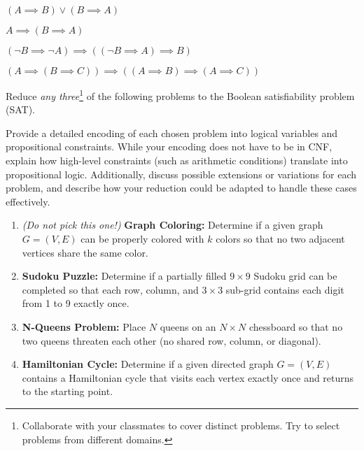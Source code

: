 \documentclass[a4paper,12pt]{article}
\begin{document}
\begin{tasks}
    \begin{multicols}{2}
    \begin{subtasks}
        \item $(A \implies B) \lor (B \implies A)$
        \item $A \implies (B \implies A)$
        \item $(\neg B \implies \neg A) \implies ((\neg B \implies A) \implies B)$
        \item $(A \implies (B \implies C)) \implies ((A \implies B) \implies (A \implies C))$
    \end{subtasks}
    \end{multicols}


    \item Reduce \emph{any three}\footnote{Collaborate with your classmates to cover distinct problems. Try to select problems from different domains.} of the following problems to the Boolean satisfiability problem (SAT).

    Provide a detailed encoding of each chosen problem into logical variables and propositional constraints.
    While your encoding does not have to be in CNF, explain how high-level constraints (such as arithmetic conditions) translate into propositional logic.
    Additionally, discuss possible extensions or variations for each problem, and describe how your reduction could be adapted to handle these cases effectively.

    \begin{enumerate}[start=0]
        \item \emph{(Do not pick this one!)} \textbf{Graph Coloring:}
        Determine if a given graph $G = (V, E)$ can be properly colored with $k$ colors so that no two adjacent vertices share the same color.

        \item \textbf{Sudoku Puzzle:}
        Determine if a partially filled $9 \times 9$ Sudoku grid can be completed so that each row, column, and $3 \times 3$ sub-grid contains each digit from 1 to 9 exactly once.

        \item \textbf{N-Queens Problem:}
        Place $N$ queens on an $N \times N$ chessboard so that no two queens threaten each other (no shared row, column, or diagonal).

        \item \textbf{Hamiltonian Cycle:}
        Determine if a given directed graph $G = (V, E)$ contains a Hamiltonian cycle that visits each vertex exactly once and returns to the starting point.


\end{enumerate}
\end{tasks}
\end{document}

